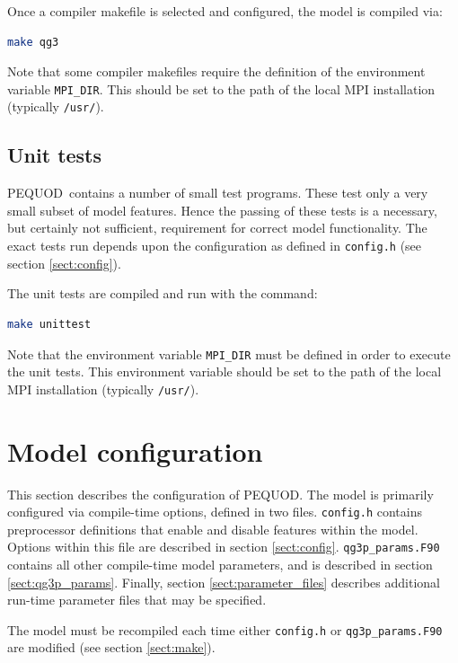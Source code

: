 \documentclass[a4paper]{book}
\newcommand{\pequod}{PEQUOD}
\begin{document}
Once a compiler makefile is selected and configured, the model is compiled via:
\begin{lstlisting}[language = bash, frame = single]
make qg3
\end{lstlisting}

Note that some compiler makefiles require the definition of the environment
variable \verb+MPI_DIR+. This should be set to the path of the local MPI
installation (typically \verb+/usr/+).

\section{Unit tests}\label{sect:tests}

\pequod\ contains a number of small test programs. These test only a very small
subset of model features. Hence the passing of these tests is a necessary, but
certainly not sufficient, requirement for correct model functionality. The exact
tests run depends upon the configuration as defined in \verb+config.h+ (see
section \ref{sect:config}).

The unit tests are compiled and run with the command:
\begin{lstlisting}[language = bash, frame = single]
make unittest
\end{lstlisting}

Note that the environment variable \verb+MPI_DIR+ must be defined in order to
execute the unit tests. This environment variable should be set to the path of
the local MPI installation (typically \verb+/usr/+).

\chapter{Model configuration}\label{sect:configuration}

This section describes the configuration of \pequod. The model is primarily
configured via compile-time options, defined in two files. \verb+config.h+
contains preprocessor definitions that enable and disable features within the
model. Options within this file are described in section \ref{sect:config}.
\verb+qg3p_params.F90+ contains all other compile-time model parameters, and is
described in section \ref{sect:qg3p_params}. Finally, section
\ref{sect:parameter_files} describes additional run-time parameter files that
may be specified.

The model must be recompiled each time either \verb+config.h+ or
\verb+qg3p_params.F90+ are modified (see section \ref{sect:make}).
\end{document}
